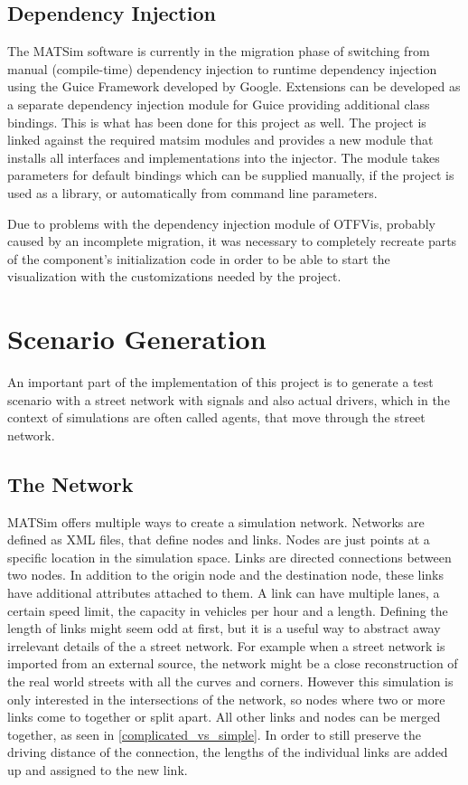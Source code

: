 \subsection*{Dependency Injection}

The MATSim software is currently in the migration phase of switching from manual (compile-time) dependency injection to runtime dependency injection using the Guice Framework developed by Google. Extensions can be developed as a separate dependency injection module for Guice providing additional class bindings. This is what has been done for this project as well. The project is linked against the required matsim modules and provides a new module that installs all interfaces and implementations into the injector. The module takes parameters for default bindings which can be supplied manually, if the project is used as a library, or automatically from command line parameters.

Due to problems with the dependency injection module of OTFVis, probably caused by an incomplete migration, it was necessary to completely recreate parts of the component's initialization code in order to be able to start the visualization with the customizations needed by the project.

\section{Scenario Generation}
\label{scenario_generation}

An important part of the implementation of this project is to generate a test scenario with a street network with signals and also actual drivers, which in the context of simulations are often called agents, that move through the street network.

\subsection*{The Network}

MATSim offers multiple ways to create a simulation network. Networks are defined as XML files, that define nodes and links. Nodes are just points at a specific location in the simulation space. Links are directed connections between two nodes. In addition to the origin node and the destination node, these links have additional attributes attached to them. A link can have multiple lanes, a certain speed limit, the capacity in vehicles per hour and a length. Defining the length of links might seem odd at first, but it is a useful way to abstract away irrelevant details of the a street network. For example when a street network is imported from an external source, the network might be a close reconstruction of the real world streets with all the curves and corners. However this simulation is only interested in the intersections of the network, so nodes where two or more links come to together or split apart. All other links and nodes can be merged together, as seen in \autoref{complicated_vs_simple}. In order to still preserve the driving distance of the connection, the lengths of the individual links are added up and assigned to the new link.

